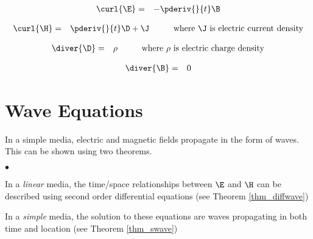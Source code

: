 \begin{axiom}
\label{axiom_mf}
\begin{eqnarray*}
   \curl{\E} &=& -\pderiv{}{t}\B
\end{eqnarray*}
\end{axiom}

\begin{axiom}
\label{axiom_ma}
\begin{eqnarray*}
   \curl{\H} &=& \pderiv{}{t}\D + \J
   \hspace{1cm}\text{where $\J$ is electric current density}
\end{eqnarray*}
\end{axiom}

\begin{axiom}
\label{axiom_mgd}
\begin{eqnarray*}
   \diver{\D} &=& \rho
   \hspace{1cm}\text{where $\rho$ is electric charge density}
\end{eqnarray*}
\end{axiom}

\begin{axiom}
\label{axiom_mgb}
\begin{eqnarray*}
   \diver{\B} &=& 0
\end{eqnarray*}
\end{axiom}



\section{Wave Equations}
In a simple media, electric and magnetic fields propagate in the form of waves.
This can be shown using two theorems.

\begin{list}{$\bullet$}{\setlength{\parsep }{0ex} \setlength{\itemsep}{0.5ex}}
   \item In a {\em linear} media,
         the time/space relationships between $\E$ and $\H$
         can be described using second order differential equations
        (see Theorem \ref{thm_diffwave})
   \item In a {\em simple} media,
         the solution to these equations are waves propagating in both time and location
        (see Theorem \ref{thm_swave})
\end{list}

